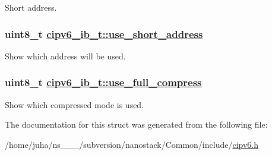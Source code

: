 Short address. \hypertarget{structcipv6__ib__t_d05d62d4e95b0a7ea7a9ee993b506cde}{
\subsubsection[use\_\-short\_\-address]{\setlength{\rightskip}{0pt plus 5cm}uint8\_\-t \hyperlink{structcipv6__ib__t_d05d62d4e95b0a7ea7a9ee993b506cde}{cipv6\_\-ib\_\-t::use\_\-short\_\-address}}}
\label{structcipv6__ib__t_d05d62d4e95b0a7ea7a9ee993b506cde}


Show which address will be used. \hypertarget{structcipv6__ib__t_f4b81848abaa43f3c7ae7ade198551d9}{
\subsubsection[use\_\-full\_\-compress]{\setlength{\rightskip}{0pt plus 5cm}uint8\_\-t \hyperlink{structcipv6__ib__t_f4b81848abaa43f3c7ae7ade198551d9}{cipv6\_\-ib\_\-t::use\_\-full\_\-compress}}}
\label{structcipv6__ib__t_f4b81848abaa43f3c7ae7ade198551d9}


Show which compressed mode is used. 

The documentation for this struct was generated from the following file:\begin{CompactItemize}
\item 
/home/juha/ns\_\_\_/subversion/nanostack/Common/include/\hyperlink{cipv6_8h}{cipv6.h}\end{CompactItemize}
